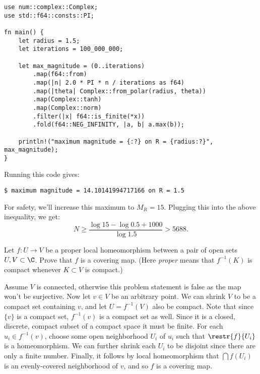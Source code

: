 \documentclass[11pt,letterpaper]{article}
\begin{document}
\begin{solution}
\begin{lstlisting}
use num::complex::Complex;
use std::f64::consts::PI;

fn main() {
    let radius = 1.5;
    let iterations = 100_000_000;

    let max_magnitude = (0..iterations)
        .map(f64::from)
        .map(|n| 2.0 * PI * n / iterations as f64)
        .map(|theta| Complex::from_polar(radius, theta))
        .map(Complex::tanh)
        .map(Complex::norm)
        .filter(|x| f64::is_finite(*x))
        .fold(f64::NEG_INFINITY, |a, b| a.max(b));

    println!("maximum magnitude = {:?} on R = {radius:?}", max_magnitude);
}
\end{lstlisting}

Running this code gives:

\begin{lstlisting}
$ maximum magnitude = 14.10141994717166 on R = 1.5
\end{lstlisting}

For safety, we'll increase this maximum to $M_R = 15$. Plugging this into the above inequality, we get:
\[
    N \geq \frac{\log 15 - \log 0.5 + 1000}{\log 1.5} > 5688
.\] 

\end{solution}

\begin{problem}
    Let $f : U \to V$ be a proper local homeomorphism between a pair of open sets $U, V\subset \C$. Prove that $f$ is a covering map. (Here \emph{proper} means that $f^{-1}(K)$ is compact whenever $K\subset V$ is compact.)
\end{problem}

\begin{solution}
    \quad Assume $V$ is connected, otherwise this problem statement is false as the map won't be surjective. Now let $v\in V$ be an arbitrary point. We can shrink $V$ to be a compact set containing $v$, and let $U=f^{-1}(V)$ also be compact. Note that since $\{v\}$ is a compact set, $f^{-1}(v)$ is a compact set as well. Since it is a closed, discrete, compact subset of a compact space it must be finite. For each $u_i\in f^{-1}(v)$, choose some open neighborhood $U_i$ of $u_i$ such that $\restr{f}{U_i}$ is a homeomorphism. We can further shrink each $U_i$ to be disjoint since there are only a finite number. Finally, it follows by local homeomorphism that $\bigcap f(U_i)$ is an evenly-covered neighborhood of $v$, and so $f$ is a covering map.
\end{solution}
\end{document}

